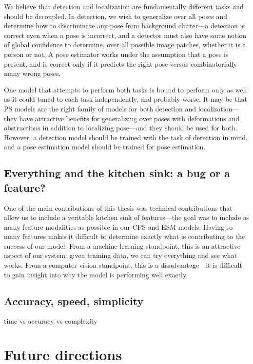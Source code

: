 We believe that detection and localization are fundamentally different tasks 
and should be decoupled.  In detection, we wish to generalize over all poses 
and determine how to discriminate any pose from background clutter---a 
detection is correct even when a pose is incorrect, and a detector must also 
have some notion of global confidence to determine, over all possible image 
patches, whether it is a person or not.  A pose estimator works under the 
assumption that a pose is present, and is correct only if it predicts the right 
pose versus combinatorially many wrong poses.

One model that attempts to perform both tasks is bound to perform only as well 
as it could tuned to each task independently, and probably worse.  It may be 
that PS models are the right family of models for both detection and 
localization---they have attractive benefits for generalizing over poses with 
deformations and obstructions in addition to localizing pose---and they should 
be used for both.  However, a detection model should be trained with the task 
of detection in mind, and a pose estimation model should be trained for pose 
estimation. 

\section{Everything and the kitchen sink: a bug or a feature?}
One of the main contributions of this thesis was technical contributions that 
allow us to include a veritable kitchen sink of features---the goal was to 
include as many feature modalities as possible in our CPS and ESM models.  
Having so many features makes it difficult to determine exactly what is 
contributing to the success of our model.  From a machine learning standpoint, 
this is an attractive aspect of our system: given training data, we can try 
everything and see what works.  From a computer vision standpoint, this is a 
disadvantage---it is difficult to gain insight into why the model is performing 
well exactly.


\section{Accuracy, speed, simplicity}
time vs accuracy vs complexity

\chapter{Future directions}

